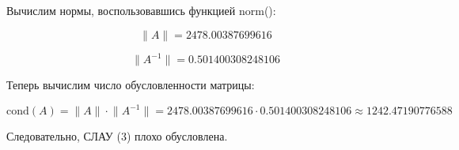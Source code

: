 \documentclass[a4paper, 12pt]{extarticle}
\begin{document}

Вычислим нормы, воспользовавшись функцией norm():

\begin{equation}
    \lVert A \rVert      = 2478.00387699616 
\end{equation}

\begin{equation}
    \lVert A^{-1} \rVert = 0.501400308248106
\end{equation}

Теперь вычислим число обусловленности матрицы:

\begin{equation}
    \textrm{cond}(A) = \lVert A \rVert \cdot \lVert A^{-1} \rVert = 2478.00387699616 \cdot 0.501400308248106 \approx 1242.47190776588
\end{equation}

Следовательно, СЛАУ (3) плохо обусловлена.
\end{document}
